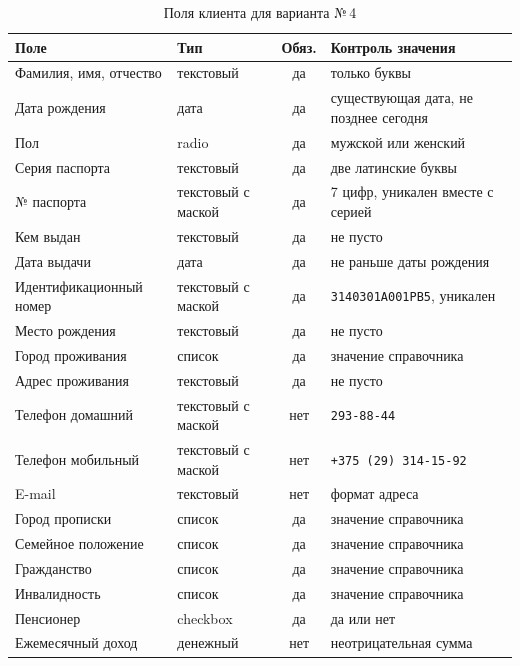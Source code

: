 \documentclass[14pt,a4paper]{extarticle}
\begin{document}
\begin{table}[H]
\caption{Поля клиента для варианта №\,4}
\label{tab:fields}
\centering
\footnotesize
\begin{tabularx}{\textwidth}{lXcl}
\toprule
Поле & Тип & Обяз. & Контроль значения \\
\midrule
Фамилия, имя, отчество & текстовый & да & только буквы \\
Дата рождения & дата & да & существующая дата, не позднее сегодня \\
Пол & radio & да & мужской или женский \\
Серия паспорта & текстовый & да & две латинские буквы \\
№ паспорта & текстовый с маской & да & 7 цифр, уникален вместе с серией \\
Кем выдан & текстовый & да & не пусто \\
Дата выдачи & дата & да & не раньше даты рождения \\
Идентификационный номер & текстовый с маской & да & \texttt{3140301A001PB5}, уникален \\
Место рождения & текстовый & да & не пусто \\
Город проживания & список & да & значение справочника \\
Адрес проживания & текстовый & да & не пусто \\
Телефон домашний & текстовый с маской & нет & \texttt{293-88-44} \\
Телефон мобильный & текстовый с маской & нет & \texttt{+375 (29) 314-15-92} \\
E-mail & текстовый & нет & формат адреса \\
Город прописки & список & да & значение справочника \\
Семейное положение & список & да & значение справочника \\
Гражданство & список & да & значение справочника \\
Инвалидность & список & да & значение справочника \\
Пенсионер & checkbox & да & да или нет \\
Ежемесячный доход & денежный & нет & неотрицательная сумма \\
\bottomrule
\end{tabularx}
\end{table}
\end{document}
